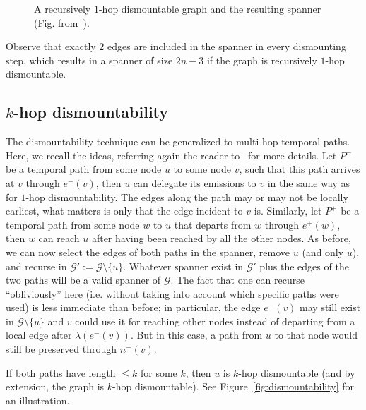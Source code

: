 \documentclass[USenglish, a4paper, thm-restate,numberwithinsect, cleveref]{lipics-v2021}
\newcommand{\G}{\ensuremath{\mathcal{G}}\xspace}
\begin{document}
\begin{figure}[ht]
\begin{subfigure}[b]{0.22\textwidth}
{\begin{tikzpicture}[scale=2.5]
  \end{tikzpicture}
          }
          \label{fig:full_dism_spanner}
     \end{subfigure}
     \caption{\label{fig:full_dismountability} A recursively $1$-hop dismountable graph and the resulting spanner (Fig. from~\cite{CPS19}).}
 \end{figure}

 Observe that exactly $2$ edges are included in the spanner in every dismounting step, which results in a spanner of size $2n-3$ if the graph is recursively $1$-hop dismountable.



\subsection{$k$-hop dismountability}
The dismountability technique can be generalized to multi-hop temporal paths. Here, we recall the ideas, referring again the reader to~\cite{CPS19} for more details. Let $P^-$ be a temporal path from some node $u$ to some node $v$, such that this path arrives at $v$ through $e^-(v)$, then $u$ can delegate its emissions to $v$ in the same way as for $1$-hop dismountability. The edges along the path may or may not be locally earliest, what matters is only that the edge incident to $v$ is.
Similarly, let $P^+$ be a temporal path from some node $w$ to $u$ that departs from $w$ through $e^+(w)$, then $w$ can reach $u$ after having been reached by all the other nodes. As before, we can now select the edges of both paths in the spanner, remove $u$ (and only $u$), and recurse in $\G':=\G \setminus \{u\}$. Whatever spanner exist in $\G'$ plus the edges of the two paths will be a valid spanner of $\G$. The fact that one can recurse ``obliviously'' here (i.e. without taking into account which specific paths were used) is less immediate than before; in particular, the edge $e^-(v)$ may still exist in $\G \setminus \{u\}$ and $v$ could use it for reaching other nodes instead of departing from a local edge after $\lambda(e^-(v))$. But in this case, a path from $u$ to that node would still be preserved through $n^-(v)$.

If both paths have length $\le k$ for some $k$, then $u$ is $k$-hop dismountable (and by extension, the graph is $k$-hop dismountable).
See Figure~\ref{fig:dismountability} for an illustration.
\end{document}
